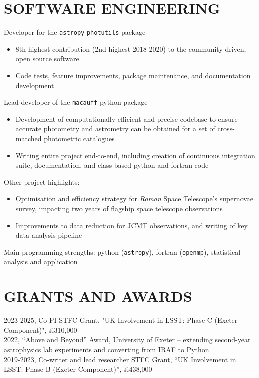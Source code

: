 \documentclass[letter, margin, 10pt]{res} %
\begin{document}
\begin{resume}
\section{SOFTWARE ENGINEERING}

Developer for the \texttt{astropy} \texttt{photutils} package
\begin{itemize}[noitemsep,topsep=0pt,parsep=0pt,partopsep=0pt]
\item 8th highest contribution (2nd highest 2018-2020) to the community-driven, open source software
\item Code tests, feature improvements, package maintenance, and documentation development
\end{itemize}
\vspace{-10pt}
Lead developer of the \texttt{macauff} python package
\begin{itemize}[noitemsep,topsep=0pt,parsep=0pt,partopsep=0pt]
\item Development of computationally efficient and precise codebase to ensure accurate photometry and astrometry can be obtained for a set of cross-matched photometric catalogues
\item Writing entire project end-to-end, including creation of continuous integration suite, documentation, and class-based python and fortran code
\end{itemize}
\vspace{-10pt}
Other project highlights:
\begin{itemize}[noitemsep,topsep=0pt,parsep=0pt,partopsep=0pt]
\item Optimisation and efficiency strategy for \textit{Roman} Space Telescope's supernovae survey, impacting two years of flagship space telescope observations
\item Improvements to data reduction for JCMT observations, and writing of key data analysis pipeline
\end{itemize}
\vspace{-10pt}
Main programming strengths: python (\texttt{astropy}), fortran (\texttt{openmp}), statistical analysis and application

\parskip 5pt
\vspace{-6pt}
\section{GRANTS AND AWARDS}
2023-2025, Co-PI STFC Grant, "UK Involvement in LSST: Phase C (Exeter Component)", £310,000\\
2022, ``Above and Beyond'' Award, University of Exeter -- extending second-year astrophysics lab experiments and converting from IRAF to Python\\
2019-2023, Co-writer and lead researcher STFC Grant, ``UK Involvement in LSST: Phase B (Exeter Component)'', £438,000


\end{resume}
\end{document}
